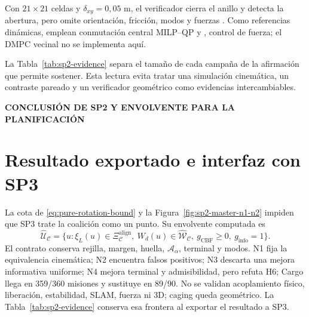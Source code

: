 \documentclass[12pt,a4paper]{article}
\newcommand{\leveltag}[1]{%
  \Needspace{5.5\baselineskip}%
  \noindent\colorbox{VIUDark}{%
    \parbox{\dimexpr\textwidth-2\fboxsep\relax}{%
      \color{white}\sffamily\bfseries\small #1%
    }%
  }\par\smallskip
}
\begin{document}
Con $21\times21$ celdas y $\delta_{xy}=0{,}05$ m, el verificador cierra el anillo
y detecta la abertura, pero omite orientación, fricción, modos y fuerzas
\parencite{pereira2004caging,fink2008caging}. Como referencias dinámicas,
\textcite{lee2025switching} emplean conmutación central MILP--QP y
\textcite{rosenfelder2024force}, control de fuerza; el DMPC vecinal no se
implementa aquí.

La Tabla~\ref{tab:sp2-evidence} separa el tamaño de cada campaña de la
afirmación que permite sostener. Esta lectura evita tratar una simulación
cinemática, un contraste pareado y un verificador geométrico como evidencias
intercambiables.
\begin{table}[H]
\centering
\fontsize{8.4}{8.95}\selectfont
\setlength{\tabcolsep}{3.0pt}
\renewcommand{\arraystretch}{0.94}
\caption{Resultados de SP2, unidad experimental y límite de validez.}
\label{tab:sp2-evidence}

\end{table}

\leveltag{CONCLUSIÓN DE SP2 Y ENVOLVENTE PARA LA PLANIFICACIÓN}
\section*{Resultado exportado e interfaz con SP3}

La cota de \eqref{eq:pure-rotation-bound} y la
Figura~\ref{fig:sp2-master-n1-n2} impiden que SP3 trate la coalición como un
punto. Su envolvente computada es
\begin{equation}
\widehat{\mathcal U}_{\mathcal C}=
\{u:\xi_L(u)\in\Xi_{\mathcal C}^{\mathrm{align}},\ W_d(u)\in
\widehat{\mathcal W}_{\mathcal C},\ g_{\mathrm{CBF}}\geq0,\ g_{\mathrm{info}}=1\}.
\label{eq:virtual-vehicle}
\end{equation}
El contrato conserva rejilla, margen, huella, $\mathcal A_\alpha$, terminal y
modos. N1 fija la equivalencia
cinemática; N2 encuentra \SPTwoReadyNTwoFalse{} falsos positivos; N3 descarta
una mejora informativa uniforme; N4 mejora terminal y admisibilidad, pero
refuta H6; Cargo llega en 359/360 misiones y sustituye en 89/90. No se validan
acoplamiento físico, liberación, estabilidad, SLAM, fuerza ni 3D; caging queda
geométrico. La Tabla~\ref{tab:sp2-evidence} conserva esa frontera al exportar el
resultado a SP3.
\end{document}
